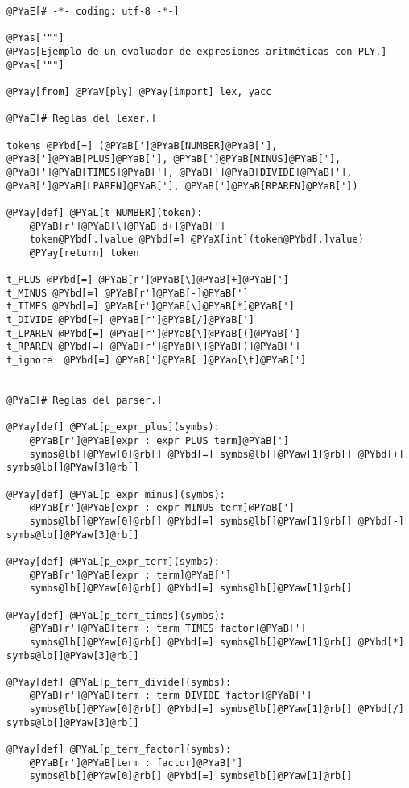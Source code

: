 \begin{Verbatim}[commandchars=@\[\]]
@PYaE[# -*- coding: utf-8 -*-]

@PYas["""]
@PYas[Ejemplo de un evaluador de expresiones aritméticas con PLY.]
@PYas["""]

@PYay[from] @PYaV[ply] @PYay[import] lex, yacc

@PYaE[# Reglas del lexer.]

tokens @PYbd[=] (@PYaB[']@PYaB[NUMBER]@PYaB['], @PYaB[']@PYaB[PLUS]@PYaB['], @PYaB[']@PYaB[MINUS]@PYaB['], @PYaB[']@PYaB[TIMES]@PYaB['], @PYaB[']@PYaB[DIVIDE]@PYaB['], @PYaB[']@PYaB[LPAREN]@PYaB['], @PYaB[']@PYaB[RPAREN]@PYaB['])

@PYay[def] @PYaL[t_NUMBER](token):
    @PYaB[r']@PYaB[\]@PYaB[d+]@PYaB[']
    token@PYbd[.]value @PYbd[=] @PYaX[int](token@PYbd[.]value)
    @PYay[return] token

t_PLUS @PYbd[=] @PYaB[r']@PYaB[\]@PYaB[+]@PYaB[']
t_MINUS @PYbd[=] @PYaB[r']@PYaB[-]@PYaB[']
t_TIMES @PYbd[=] @PYaB[r']@PYaB[\]@PYaB[*]@PYaB[']
t_DIVIDE @PYbd[=] @PYaB[r']@PYaB[/]@PYaB[']
t_LPAREN @PYbd[=] @PYaB[r']@PYaB[\]@PYaB[(]@PYaB[']
t_RPAREN @PYbd[=] @PYaB[r']@PYaB[\]@PYaB[)]@PYaB[']
t_ignore  @PYbd[=] @PYaB[']@PYaB[ ]@PYao[\t]@PYaB[']


@PYaE[# Reglas del parser.]

@PYay[def] @PYaL[p_expr_plus](symbs):
    @PYaB[r']@PYaB[expr : expr PLUS term]@PYaB[']
    symbs@lb[]@PYaw[0]@rb[] @PYbd[=] symbs@lb[]@PYaw[1]@rb[] @PYbd[+] symbs@lb[]@PYaw[3]@rb[]
    
@PYay[def] @PYaL[p_expr_minus](symbs):
    @PYaB[r']@PYaB[expr : expr MINUS term]@PYaB[']
    symbs@lb[]@PYaw[0]@rb[] @PYbd[=] symbs@lb[]@PYaw[1]@rb[] @PYbd[-] symbs@lb[]@PYaw[3]@rb[]
    
@PYay[def] @PYaL[p_expr_term](symbs):
    @PYaB[r']@PYaB[expr : term]@PYaB[']
    symbs@lb[]@PYaw[0]@rb[] @PYbd[=] symbs@lb[]@PYaw[1]@rb[]

@PYay[def] @PYaL[p_term_times](symbs):
    @PYaB[r']@PYaB[term : term TIMES factor]@PYaB[']
    symbs@lb[]@PYaw[0]@rb[] @PYbd[=] symbs@lb[]@PYaw[1]@rb[] @PYbd[*] symbs@lb[]@PYaw[3]@rb[]
    
@PYay[def] @PYaL[p_term_divide](symbs):
    @PYaB[r']@PYaB[term : term DIVIDE factor]@PYaB[']
    symbs@lb[]@PYaw[0]@rb[] @PYbd[=] symbs@lb[]@PYaw[1]@rb[] @PYbd[/] symbs@lb[]@PYaw[3]@rb[]
    
@PYay[def] @PYaL[p_term_factor](symbs):
    @PYaB[r']@PYaB[term : factor]@PYaB[']
    symbs@lb[]@PYaw[0]@rb[] @PYbd[=] symbs@lb[]@PYaw[1]@rb[]


\end{Verbatim}
